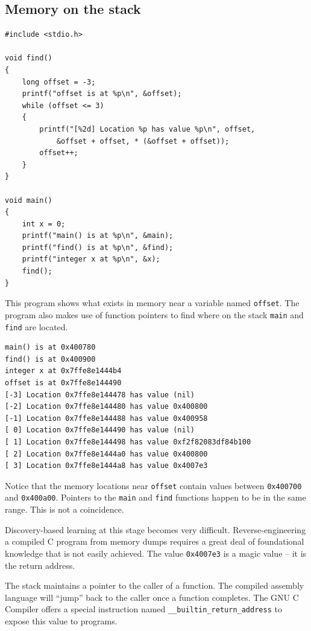 \documentclass{book}
\begin{document}
\subsection{Memory on the stack}

\begin{lstlisting}[caption={todo}, captionpos=b, mathescape, xleftmargin=.25in, xrightmargin=.25in]
#include <stdio.h>

void find()
{
    long offset = -3;
    printf("offset is at %p\n", &offset);
    while (offset <= 3)
    {
        printf("[%2d] Location %p has value %p\n", offset,
            &offset + offset, * (&offset + offset));
        offset++;
    }
}

void main()
{
    int x = 0;
    printf("main() is at %p\n", &main);
    printf("find() is at %p\n", &find);
    printf("integer x at %p\n", &x);
    find();
}
\end{lstlisting}

This program shows what exists in memory near a variable named \texttt{offset}. The program also makes use of function pointers to find where on the stack \texttt{main} and \texttt{find} are located.

\begin{lstlisting}[caption={todo}, captionpos=b, mathescape, xleftmargin=.25in, xrightmargin=.25in]
main() is at 0x400780          
find() is at 0x400900    
integer x at 0x7ffe8e1444b4    
offset is at 0x7ffe8e144490
[-3] Location 0x7ffe8e144478 has value (nil)
[-2] Location 0x7ffe8e144480 has value 0x400800
[-1] Location 0x7ffe8e144488 has value 0x400958
[ 0] Location 0x7ffe8e144490 has value (nil)
[ 1] Location 0x7ffe8e144498 has value 0xf2f82083df84b100
[ 2] Location 0x7ffe8e1444a0 has value 0x400800
[ 3] Location 0x7ffe8e1444a8 has value 0x4007e3
\end{lstlisting}

Notice that the memory locations near \texttt{offset} contain values between \texttt{0x400700} and \texttt{0x400a00}. Pointers to the \texttt{main} and \texttt{find} functions happen to be in the same range. This is not a coincidence.

Discovery-based learning at this stage becomes very difficult. Reverse-engineering a compiled C program from memory dumps requires a great deal of foundational knowledge that is not easily achieved. The value \texttt{0x4007e3} is a magic value -- it is the return address.

The stack maintains a pointer to the caller of a function. The compiled assembly language will ``jump'' back to the caller once a function completes. The GNU C Compiler offers a special instruction named \texttt{\_\_builtin\_return\_address} to expose this value to programs.
\end{document}
